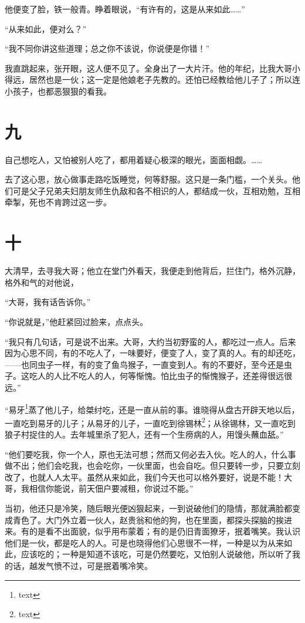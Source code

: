 \documentclass[12pt,UTF8]{ctexbook}
\begin{document}
他便变了脸，铁一般青。睁着眼说，“有许有的，这是从来如此……”

“从来如此，便对么？”

“我不同你讲这些道理；总之你不该说，你说便是你错！”

我直跳起来，张开眼，这人便不见了。全身出了一大片汗。他的年纪，比我大哥小得远，居然也是一伙；这一定是他娘老子先教的。还怕已经教给他儿子了；所以连小孩子，也都恶狠狠的看我。

\section{九}

自己想吃人，又怕被别人吃了，都用着疑心极深的眼光，面面相觑。……

去了这心思，放心做事走路吃饭睡觉，何等舒服。这只是一条门槛，一个关头。他们可是父子兄弟夫妇朋友师生仇敌和各不相识的人，都结成一伙，互相劝勉，互相牵掣，死也不肯跨过这一步。

\section{十}

大清早，去寻我大哥；他立在堂门外看天，我便走到他背后，拦住门，格外沉静，格外和气的对他说，

“大哥，我有话告诉你。”

“你说就是，”他赶紧回过脸来，点点头。

“我只有几句话，可是说不出来。大哥，大约当初野蛮的人，都吃过一点人。后来因为心思不同，有的不吃人了，一味要好，便变了人，变了真的人。有的却还吃，——也同虫子一样，有的变了鱼鸟猴子，一直变到人。有的不要好，至今还是虫子。这吃人的人比不吃人的人，何等惭愧。怕比虫子的惭愧猴子，还差得很远很远。”

“易牙\footnote{text}蒸了他儿子，给桀纣吃，还是一直从前的事。谁晓得从盘古开辟天地以后，一直吃到易牙的儿子；从易牙的儿子，一直吃到徐锡林\footnote{text}；从徐锡林，又一直吃到狼子村捉住的人。去年城里杀了犯人，还有一个生痨病的人，用馒头蘸血舐。”

“他们要吃我，你一个人，原也无法可想；然而又何必去入伙。吃人的人，什么事做不出；他们会吃我，也会吃你，一伙里面，也会自吃。但只要转一步，只要立刻改了，也就人人太平。虽然从来如此，我们今天也可以格外要好，说是不能！大哥，我相信你能说，前天佃户要减租，你说过不能。”

当初，他还只是冷笑，随后眼光便凶狠起来，一到说破他们的隐情，那就满脸都变成青色了。大门外立着一伙人，赵贵翁和他的狗，也在里面，都探头探脑的挨进来。有的是看不出面貌，似乎用布蒙着；有的是仍旧青面獠牙，抿着嘴笑。我认识他们是一伙，都是吃人的人。可是也晓得他们心思很不一样，一种是以为从来如此，应该吃的；一种是知道不该吃，可是仍然要吃，又怕别人说破他，所以听了我的话，越发气愤不过，可是抿着嘴冷笑。
\end{document}
